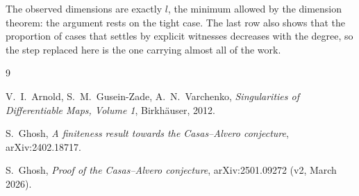 \documentclass[11pt,reqno]{amsart}
\theoremstyle{plain}
\theoremstyle{definition}
\begin{document}
The observed dimensions are exactly $l$, the minimum allowed by the dimension
theorem: the argument rests on the tight case. The last row also shows that the
proportion of cases that \cite{Gho} settles by explicit witnesses decreases with
the degree, so the step replaced here is the one carrying almost all of the
work.

\begin{thebibliography}{9}

 V.~I.~Arnold, S.~M.~Gusein-Zade, A.~N.~Varchenko,
  \emph{Singularities of Differentiable Maps, Volume 1}, Birkhäuser, 2012.

 S.~Ghosh, \emph{A finiteness result towards the Casas--Alvero
  conjecture}, arXiv:2402.18717.

 S.~Ghosh, \emph{Proof of the Casas--Alvero conjecture},
  arXiv:2501.09272 (v2, March 2026).

\end{thebibliography}
\end{document}
